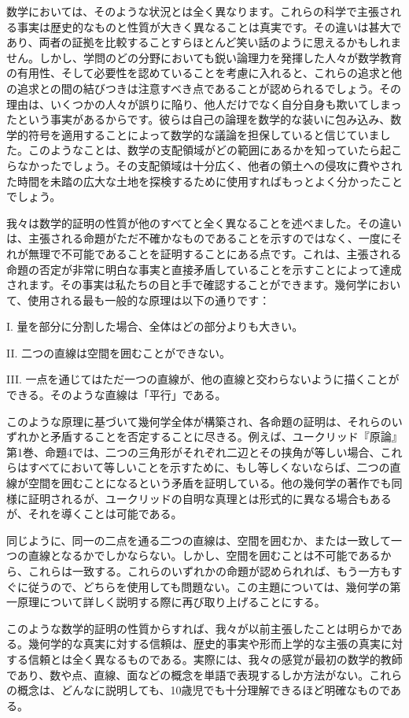 \documentclass[a4paper,11pt,openany]{ltjsbook}
\begin{document}
数学においては、そのような状況とは全く異なります。これらの科学で主張される事実は歴史的なものと性質が大きく異なることは真実です。その違いは甚大であり、両者の証拠を比較することすらほとんど笑い話のように思えるかもしれません。しかし、学問のどの分野においても鋭い論理力を発揮した人々が数学教育の有用性、そして必要性を認めていることを考慮に入れると、これらの追求と他の追求との間の結びつきは注意すべき点であることが認められるでしょう。その理由は、いくつかの人々が誤りに陥り、他人だけでなく自分自身も欺いてしまったという事実があるからです。彼らは自己の論理を数学的な装いに包み込み、数学的符号を適用することによって数学的な議論を担保していると信じていました。このようなことは、数学の支配領域がどの範囲にあるかを知っていたら起こらなかったでしょう。その支配領域は十分広く、他者の領土への侵攻に費やされた時間を未踏の広大な土地を探検するために使用すればもっとよく分かったことでしょう。

我々は数学的証明の性質が他のすべてと全く異なることを述べました。その違いは、主張される命題がただ不確かなものであることを示すのではなく、一度にそれが無理で不可能であることを証明することにある点です。これは、主張される命題の否定が非常に明白な事実と直接矛盾していることを示すことによって達成されます。その事実は私たちの目と手で確認することができます。幾何学において、使用される最も一般的な原理は以下の通りです：

I. 量を部分に分割した場合、全体はどの部分よりも大きい。

II. 二つの直線は空間を囲むことができない。

III. 一点を通じてはただ一つの直線が、他の直線と交わらないように描くことができる。そのような直線は「平行」である。

このような原理に基づいて幾何学全体が構築され、各命題の証明は、それらのいずれかと矛盾することを否定することに尽きる。例えば、ユークリッド『原論』第1巻、命題4では、二つの三角形がそれぞれ二辺とその挟角が等しい場合、これらはすべてにおいて等しいことを示すために、もし等しくないならば、二つの直線が空間を囲むことになるという矛盾を証明している。他の幾何学の著作でも同様に証明されるが、ユークリッドの自明な真理とは形式的に異なる場合もあるが、それを導くことは可能である。

同じように、同一の二点を通る二つの直線は、空間を囲むか、または一致して一つの直線となるかでしかならない。しかし、空間を囲むことは不可能であるから、これらは一致する。これらのいずれかの命題が認められれば、もう一方もすぐに従うので、どちらを使用しても問題ない。この主題については、幾何学の第一原理について詳しく説明する際に再び取り上げることにする。

このような数学的証明の性質からすれば、我々が以前主張したことは明らかである。幾何学的な真実に対する信頼は、歴史的事実や形而上学的な主張の真実に対する信頼とは全く異なるものである。実際には、我々の感覚が最初の数学的教師であり、数や点、直線、面などの概念を単語で表現するしか方法がない。これらの概念は、どんなに説明しても、10歳児でも十分理解できるほど明確なものである。
\end{document}
